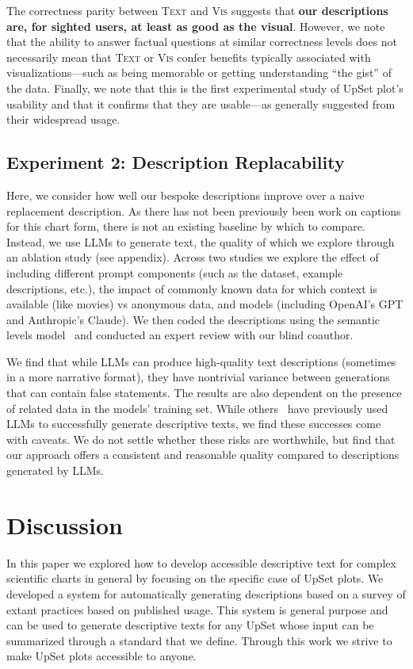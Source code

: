 \documentclass{egpubl}
\newcommand{\condition}[1]{\textsc{#1}}
\newcommand{\condVis}{\condition{Vis}}
\newcommand{\condText}{\condition{Text}}
\begin{document}
The correctness parity between \condText{} and \condVis{} suggests that \textbf{our descriptions are, for sighted users, at least as good as the visual}.
However, we note that the ability to answer factual questions at similar correctness levels does not necessarily mean that \condText{} or \condVis{} confer benefits typically associated with visualizations---such as being memorable or getting understanding ``the gist'' of the data.
Finally, we note that this is the first experimental study of UpSet plot's usability and that it confirms that they are usable---as generally suggested from their widespread usage.



\subsection{Experiment 2: Description Replacability}

Here, we consider how well our bespoke descriptions improve over a naive replacement description.
As there has not been previously been work on captions for this chart form, there is not an existing baseline by which to compare. Instead, we use LLMs to generate text, the quality of which we explore through an ablation study (see appendix).
Across two studies we explore the effect of including different prompt components (such as the dataset, example descriptions, etc.), the impact of commonly known data for which context is available (like movies) vs anonymous data, and models (including OpenAI's GPT and Anthropic's Claude).
We then coded the descriptions using the semantic levels model~\cite{lundgard_accessible_2022} and conducted an expert review with our blind coauthor.

We find that while LLMs can produce high-quality text descriptions (sometimes in a more narrative format), they have nontrivial variance between generations that can contain false statements. The results are also dependent on the presence of related data in the models' training set.
While others~\cite{duarte_autovizua11y_2024} have previously used LLMs to successfully generate descriptive texts, we find these successes come with caveats.
We do not settle whether these risks are worthwhile, but find that our approach offers a consistent and reasonable quality compared to descriptions generated by LLMs.

\section{Discussion}
In this paper we explored how to develop accessible descriptive text for complex scientific charts in general by focusing on the specific case of UpSet plots.
We developed a system for automatically generating descriptions based on a survey of extant practices based on published usage. This system is general purpose and can be used to generate descriptive texts for any UpSet whose input can be summarized through a standard that we define.
Through this work we strive to make UpSet plots accessible to anyone.
\end{document}
